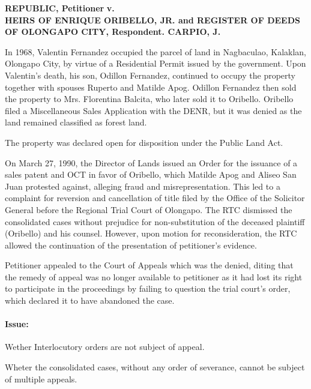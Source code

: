 \documentclass[
12pt,
oneside,
onehalfspacing,
headsepline
]{DigestCollection}
\begin{document}
\label{1eb26ab0-0a2d-11ef-a1a5-03b0bde1fccf}


\noindent\textbf{REPUBLIC}\noindent\textbf{, Petitioner}\noindent\textbf{ v. \\HEIRS OF ENRIQUE ORIBELLO, JR. and REGISTER OF DEEDS OF OLONGAPO CITY, Respondent. CARPIO, J.}\vspace{0.4cm}

In 1968, Valentin Fernandez occupied the parcel of land in Nagbaculao, Kalaklan, Olongapo City, by virtue of a Residential Permit issued by the government. Upon Valentin's death, his son, Odillon Fernandez, continued to occupy the property together with spouses Ruperto and Matilde Apog. Odillon Fernandez then sold the property to Mrs. Florentina Balcita, who later sold it to Oribello. Oribello filed a Miscellaneous Sales Application with the DENR, but it was denied as the land remained classified as forest land.

The property was declared open for disposition under the Public Land Act.

On March 27, 1990, the Director of Lands issued an Order for the issuance of a sales patent and OCT in favor of Oribello, which Matilde Apog and Aliseo San Juan protested against, alleging fraud and misrepresentation. This led to a complaint for reversion and cancellation of title filed by the Office of the Solicitor General before the Regional Trial Court of Olongapo. The RTC dismissed the consolidated cases without prejudice for non-substitution of the deceased plaintiff (Oribello) and his counsel. However, upon motion for reconsideration, the RTC allowed the continuation of the presentation of petitioner’s evidence.

Petitioner appealed to the Court of Appeals which was the denied, diting that the remedy of appeal was no longer available to petitioner as it had lost its right to participate in the proceedings by failing to question the trial court’s order, which declared it to have abandoned the case.

\paragraph{Issue:}
\label{2f4833f0-1158-11ef-b8ef-a5537d38c9c8}


Wether Interlocutory orders are not subject of appeal.

Wheter the consolidated cases, without any order of severance, cannot be subject of multiple appeals.
\end{document}
